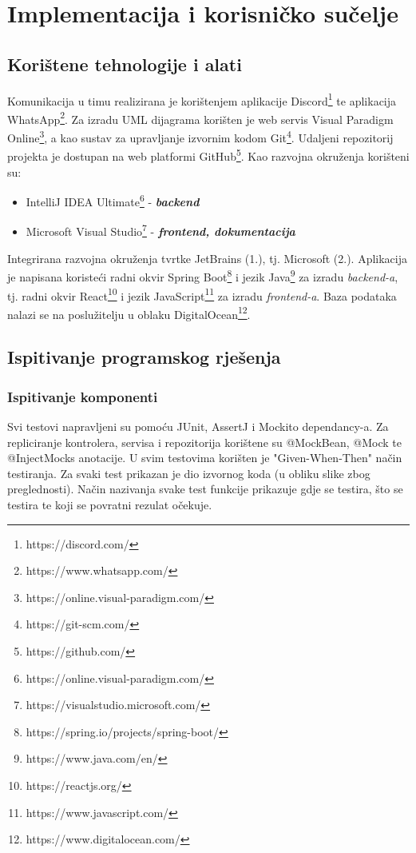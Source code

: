 \chapter{Implementacija i korisničko sučelje}
		
		
		\section{Korištene tehnologije i alati}
		
			Komunikacija u timu realizirana je korištenjem aplikacije Discord\footnote[1]{https://discord.com/} te aplikacija WhatsApp\footnote[2]{https://www.whatsapp.com/}. Za izradu UML dijagrama korišten je
			web servis Visual Paradigm Online\footnote[3]{https://online.visual-paradigm.com/}, a kao sustav za upravljanje izvornim kodom Git\footnote[4]{https://git-scm.com/}. Udaljeni repozitorij projekta je dostupan na
			web platformi GitHub\footnote[5]{https://github.com/}.
			\smallbreak
			\noindent Kao razvojna okruženja korišteni su:
			\begin{itemize}
				\item IntelliJ IDEA Ultimate\footnote[6]{https://online.visual-paradigm.com/} - \textit{\textbf{backend}}
				\item Microsoft Visual Studio\footnote[7]{https://visualstudio.microsoft.com/} - \textit{\textbf{frontend, dokumentacija}}
			\end{itemize}
			\noindent Integrirana razvojna okruženja tvrtke JetBrains (1.), tj. Microsoft (2.).
			\smallbreak
			Aplikacija je napisana koristeći radni okvir Spring Boot\footnote[8]{https://spring.io/projects/spring-boot/} i jezik Java\footnote[9]{https://www.java.com/en/} za izradu 
			\textit{backend-a}, tj. radni okvir React\footnote[10]{https://reactjs.org/} i jezik JavaScript\footnote[11]{https://www.javascript.com/} za izradu \textit{frontend-a}.
			\smallbreak
			Baza podataka nalazi se na poslužitelju u oblaku DigitalOcean\footnote[12]{https://www.digitalocean.com/}.
			\eject 
		
	
		\section{Ispitivanje programskog rješenja}
			
			\subsection{Ispitivanje komponenti}

			\noindent Svi testovi napravljeni su pomoću JUnit, AssertJ i Mockito dependancy-a.
			\medbreak
			\noindent Za repliciranje kontrolera, servisa i repozitorija korištene su @MockBean, @Mock te @InjectMocks
			anotacije.
			\medbreak
			\noindent U svim testovima korišten je "Given-When-Then" način testiranja.
			\medbreak
			\noindent Za svaki test prikazan je dio izvornog koda (u obliku slike zbog preglednosti).
			Način nazivanja svake test funkcije prikazuje gdje se testira, što se testira te koji se povratni
			rezulat očekuje.
			\eject
			

